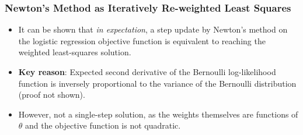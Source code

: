 \begin{frame}
\frametitle{Newton's Method as Iteratively Re-weighted Least Squares}
\begin{itemize}
\item It can be shown that \textit{in expectation}, a step update by Newton's method on the logistic regression objective function is equivalent to reaching the weighted least-squares solution.
\item \textbf{Key reason}: Expected second derivative of the Bernoulli log-likelihood function is inversely proportional to the variance of the Bernoulli distribution (proof not shown).
\item However, not a single-step solution, as the weights themselves are functions of $\theta$ and the objective function is not quadratic.

\end{itemize}
\end{frame}
  
  

%